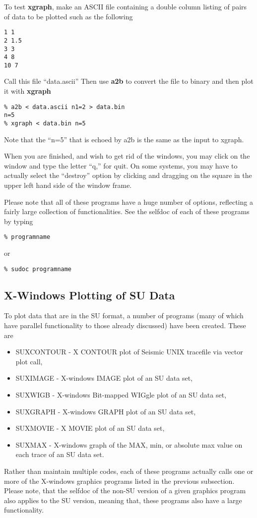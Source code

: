 {{{{To test {\bf xgraph}, make an ASCII file containing  a double
column listing of pairs of data to be plotted such as the
following
{\small\begin{verbatim}
1 1
2 1.5
3 3
4 8
10 7
\end{verbatim}\noindent
Call this file ``data.ascii''
Then use {\bf a2b\/} to convert the file to binary and then plot it
with {\bf xgraph\/}
{\small\begin{verbatim}
% a2b < data.ascii n1=2 > data.bin
n=5
% xgraph < data.bin n=5
\end{verbatim}}\noindent
Note that the ``n=5'' that is echoed by a2b is the same as
the input to xgraph.

When you are finished, and wish to get rid of the windows,
you may click on the window and type the letter ``q,'' for quit.
On some systems, you may have to actually select the ``destroy''
option by clicking and dragging on the square in the upper left
hand side of the window frame.

Please note that all of these programs have a huge number of
options, reflecting a fairly large collection of functionalities.
See the selfdoc of each of these programs by typing
{\small\begin{verbatim}
% programname
\end{verbatim}}\noindent
or
{\small\begin{verbatim}
% sudoc programname
\end{verbatim}}\noindent

\subsection{X-Windows Plotting of SU Data}

To plot data that are in the SU format, a number of programs
(many of which have parallel functionality to those already discussed)
have been created.
These are
\begin{itemize}
\item SUXCONTOUR - X CONTOUR plot of Seismic UNIX tracefile via vector
plot call,
\item SUXIMAGE - X-windows IMAGE plot of an SU data set,
\item SUXWIGB - X-windows Bit-mapped WIGgle plot of an SU data set,
\item SUXGRAPH - X-windows GRAPH plot of an SU data set, 
\item SUXMOVIE - X MOVIE plot of an SU data set,
\item SUXMAX - X-windows graph of the MAX, min, or absolute max value on     
each trace of an SU data set.
\end{itemize}
Rather than maintain multiple codes, each of these programs actually
calls one or more of the X-windows graphics programs listed in the
previous subsection. Please note, that the selfdoc of the non-SU
version of a given graphics program also applies to the SU version,
meaning that, these programs also have a large functionality.

}}}}}
